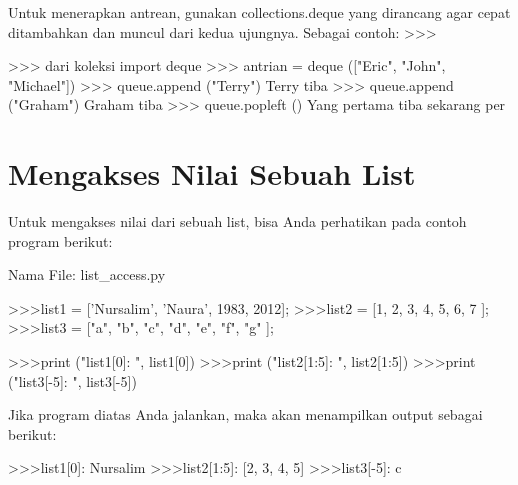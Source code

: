 Untuk menerapkan antrean, gunakan collections.deque yang dirancang agar cepat ditambahkan dan muncul dari kedua ujungnya. Sebagai contoh: 
>>> 

>>> dari koleksi import deque 
>>> antrian = deque (["Eric", "John", "Michael"]) 
>>> queue.append ("Terry")       Terry tiba 
>>> queue.append ("Graham")       Graham tiba 
>>> queue.popleft ()       Yang pertama tiba sekarang per

\section {Mengakses Nilai Sebuah List}
Untuk mengakses nilai dari sebuah list, bisa Anda perhatikan pada contoh program berikut:

Nama File: list_access.py

>>>list1 = ['Nursalim', 'Naura', 1983, 2012];
>>>list2 = [1, 2, 3, 4, 5, 6, 7 ];
>>>list3 = ["a", "b", "c", "d", "e", "f", "g" ];

>>>print ("list1[0]: ", list1[0])
>>>print ("list2[1:5]: ", list2[1:5])
>>>print ("list3[-5]: ", list3[-5])

Jika program diatas Anda jalankan, maka akan menampilkan output sebagai berikut:

>>>list1[0]:  Nursalim
>>>list2[1:5]:  [2, 3, 4, 5]
>>>list3[-5]:  c

